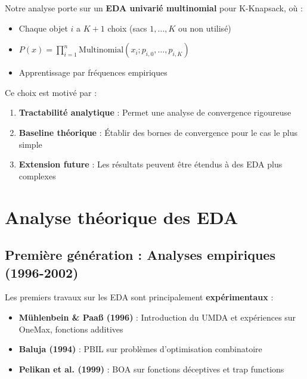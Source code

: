 \documentclass[12pt,a4paper]{article}
\theoremstyle{definition}
\theoremstyle{remark}
\begin{document}
Notre analyse porte sur un \textbf{EDA univarié multinomial} pour K-Knapsack, où :
\begin{itemize}
    \item Chaque objet $i$ a $K+1$ choix (sacs $1, \ldots, K$ ou non utilisé)
    \item $P(x) = \prod_{i=1}^n \text{Multinomial}(x_i; p_{i,0}, \ldots, p_{i,K})$
    \item Apprentissage par fréquences empiriques
\end{itemize}

Ce choix est motivé par :
\begin{enumerate}
    \item \textbf{Tractabilité analytique} : Permet une analyse de convergence rigoureuse
    \item \textbf{Baseline théorique} : Établir des bornes de convergence pour le cas le plus simple
    \item \textbf{Extension future} : Les résultats peuvent être étendus à des EDA plus complexes
\end{enumerate}

\section{Analyse théorique des EDA}

\subsection{Première génération : Analyses empiriques (1996-2002)}

Les premiers travaux sur les EDA sont principalement \textbf{expérimentaux} :

\begin{itemize}
    \item \textbf{Mühlenbein \& Paaß (1996)} \cite{muhlenbein1996recombination} : Introduction du UMDA et expériences sur OneMax, fonctions additives
    
    \item \textbf{Baluja (1994)} \cite{baluja1994population} : PBIL sur problèmes d'optimisation combinatoire
    
    \item \textbf{Pelikan et al. (1999)} \cite{pelikan1999boa} : BOA sur fonctions déceptives et trap functions
\end{itemize}
\end{document}
